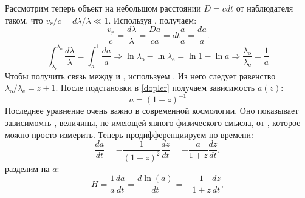 Рассмотрим теперь объект на небольшом расстоянии $D = cdt$ от наблюдателя таком, что $v_r \slash c = d \lambda \slash \lambda \ll 1$. Используя , получаем:
\begin{equation}
\frac{v_r}{c} = \frac{d \lambda}{\lambda} = \frac{D \dot{a}}{ca} = dt \frac{\dot{a}}{a} = \frac{da}{a}.
\end{equation}
\begin{equation}
\int_{\lambda_\text{e}}^{\lambda_\text{o}} \frac{d \lambda}{\lambda} = \int_{a}^{1} \frac{da}{a} \Rightarrow \ln \lambda_\text{o} - \ln \lambda_\text{e} = \ln 1 - \ln a \Rightarrow \frac{\lambda_\text{o}}{\lambda_\text{e}} = \frac{1}{a}
\label{dopler}
\end{equation}
Чтобы получить связь между  и , используем . Из него следует равенство $\lambda_{\text{o}} / \lambda_{\text{e}} = z+1.$ После подстановки в \eqref{dopler} получаем зависимость $a(z)$:
\begin{equation}
a = (1+z)^{-1}
\label{zf}
\end{equation}
Последнее уравнение очень важно в современной космологии. Оно показывает зависимомть , величины, не имеющей явного физического смысла, от , которое можно просто измерить. \newline \linebreak
Теперь продифференциируем \text{(\ref{zf}) }по времени:
\begin{equation}
\frac{da}{dt} = - \frac{1}{(1+z)^{2}} \frac{dz}{dt} = - \frac{a}{1+z} \frac{dz}{dt},
\label{dadz}
\end{equation}
разделим на $a$:
\begin{equation}
H = \frac{1}{a} \frac{da}{dt} = \frac{d\ln (a)}{dt} = - \frac{1}{1+z} \frac{dz}{dt},
\end{equation}